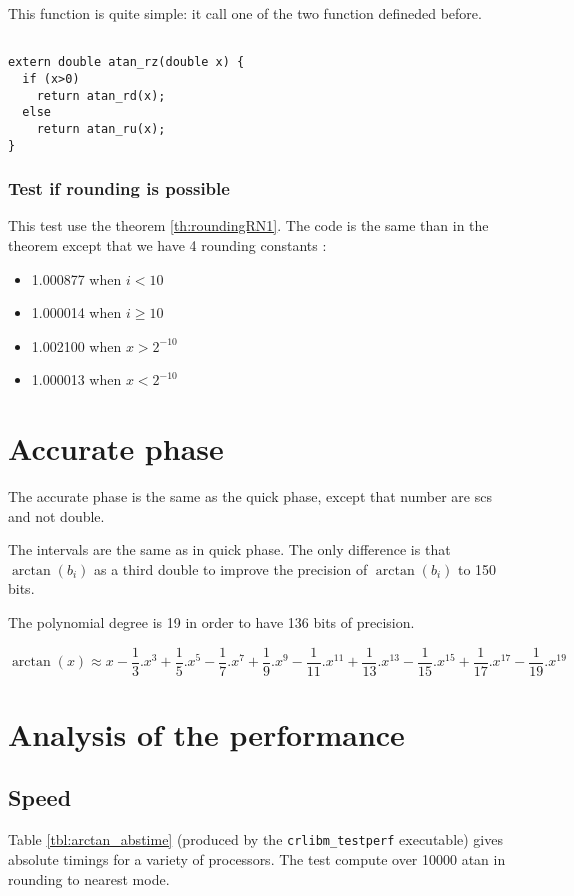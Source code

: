 This function is quite simple: it call one of the two function defineded
before.

\begin{lstlisting}[caption={Rounding to zero},firstnumber=1]

extern double atan_rz(double x) {
  if (x>0)
    return atan_rd(x);
  else
    return atan_ru(x);
}
\end{lstlisting}

\subsubsection{Test if rounding is possible}
This test use the theorem \ref{th:roundingRN1}.
The code is the same than in the theorem except that we have 4 rounding
constants : 
\begin{itemize}
\item 1.000877 when $i<10$
\item 1.000014 when $i\geq10$
\item 1.002100 when $x>2^{-10}$
\item 1.000013 when $x<2^{-10}$
\end{itemize}


\section{Accurate phase}
The accurate phase is the same as the quick phase, except that number are
scs and not double.

The intervals are the same as in quick phase. The only difference is that
$\arctan(b_i)$ as a third double to improve the precision of $\arctan(b_i)$ to
150 bits.

The polynomial degree is 19 in order to have 136 bits of precision.

\begin{equation} \arctan(x) \approx
x-\frac{1}{3}.x^3+\frac{1}{5}.x^5-\frac{1}{7}.x^7+\frac{1}{9}.x^9-\frac{1}{11}.x^{11}+\frac{1}{13}.x^{13}-\frac{1}{15}.x^{15}+\frac{1}{17}.x^{17}-\frac{1}{19}.x^{19}
\label{eq:arctan_scspoly}
\end{equation}

\section{Analysis of the performance}

\subsection{Speed}
Table \ref{tbl:arctan_abstime} (produced by the \texttt{crlibm\_testperf}
executable) gives absolute timings for a variety of processors. The test
compute over 10000 atan in rounding to nearest mode.

